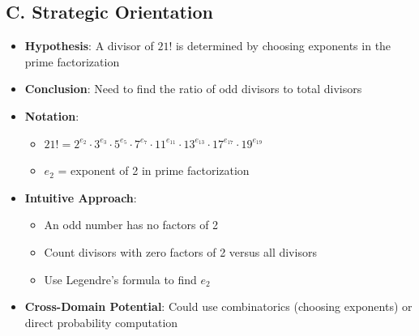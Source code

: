 \documentclass[]{article}
\begin{document}
\begin{problemconfigbox}
\subsection*{C. Strategic Orientation}
\begin{itemize}[leftmargin=*]
    \item \textbf{Hypothesis}: A divisor of $21!$ is determined by choosing exponents in the prime factorization
    \item \textbf{Conclusion}: Need to find the ratio of odd divisors to total divisors
    \item \textbf{Notation}: 
    \begin{itemize}
        \item $21! = 2^{e_2} \cdot 3^{e_3} \cdot 5^{e_5} \cdot 7^{e_7} \cdot 11^{e_{11}} \cdot 13^{e_{13}} \cdot 17^{e_{17}} \cdot 19^{e_{19}}$
        \item $e_2$ = exponent of 2 in prime factorization
    \end{itemize}
    \item \textbf{Intuitive Approach}: 
    \begin{itemize}
        \item An odd number has no factors of 2
        \item Count divisors with zero factors of 2 versus all divisors
        \item Use Legendre's formula to find $e_2$
    \end{itemize}
    \item \textbf{Cross-Domain Potential}: Could use combinatorics (choosing exponents) or direct probability computation
\end{itemize}
\end{problemconfigbox}
\end{document}
